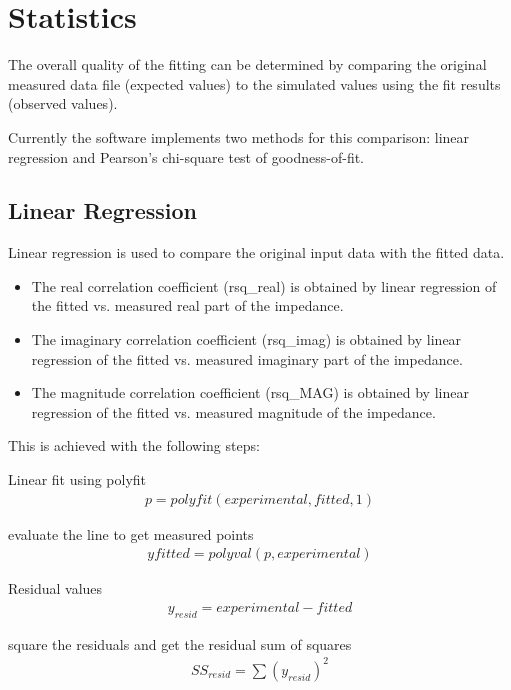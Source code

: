 \documentclass[10pt,b5paper,oneside]{book}
\begin{document}
\newpage
\section{Statistics}

The overall quality of the fitting can be determined by comparing the original measured data file (expected values) to the simulated values using the fit results (observed values).

Currently the software implements two methods for this comparison: linear regression and Pearson's chi-square test of goodness-of-fit.

\subsection{Linear Regression}

Linear regression is used to compare the original input data with the fitted data.

\begin{itemize}
	\item The real correlation coefficient (rsq\_real) is obtained by linear regression of the fitted vs. measured real part of the impedance. 
	\item The imaginary correlation coefficient (rsq\_imag) is obtained by linear regression of the fitted vs. measured imaginary part of the impedance.
	\item The magnitude correlation coefficient (rsq\_MAG) is obtained by linear regression of the fitted vs. measured magnitude of the impedance.	
\end{itemize}

This is achieved with the following steps:

Linear fit using polyfit
\begin{align}
	p = polyfit(experimental,fitted,1)
\end{align}

evaluate the line to get measured points
\begin{align}
yfitted = polyval(p,experimental)
\end{align}

Residual values
\begin{align}
	y_{resid} = experimental - fitted
\end{align}

square the residuals and get the residual sum of squares
\begin{align}
	SS_{resid} = \sum(y_{resid})^2
\end{align}
\end{document}

